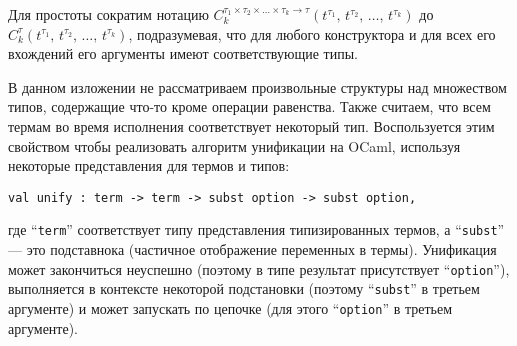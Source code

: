 \noindent Для простоты сократим нотацию  $C_k^{\tau_1\times\tau_2\times\dots\times\tau_k\to\tau}(t^{\tau_1},\,t^{\tau_2},\,\dots,\,t^{\tau_k})$ до
$C_k^\tau(t^{\tau_1},\,t^{\tau_2},\,\dots,\,t^{\tau_k})$, подразумевая, что для любого конструктора и для всех его вхождений его аргументы имеют соответствующие типы.


\begin{comment}
We need also to define the notion of a subterm  $t^\tau[p]$ of a term $t^\tau$ at given position $p$:

$$
\begin{array}{rcl}
 p=\epsilon\mid\{1, 2, 3,\dots\}\bullet p&-&\mbox{the set of positions}\\
 t^\tau[\epsilon]=t^\tau&-&\mbox{base case}\\
 C_k^\tau(t_1^{\tau_1},\,t_2^{\tau_2},\dots,\,t_k^{\tau_k})[i\bullet p]=t_i^{\tau_i}[p], 1\le i \le k&-&\mbox{inductive case}
\end{array}
$$
\end{comment}

В данном изложении   не рассматриваем произвольные структуры над множеством типов, содержащие что-то кроме операции равенства.
Также   считаем, что всем термам во время исполнения соответствует некоторый тип.
Воспользуется этим свойством чтобы реализовать алгоритм унификации на OCaml, используя некоторые представления для термов и типов:

\begin{lstlisting}[mathescape=true]
    val unify : term -> term -> subst option -> subst option,
\end{lstlisting}

\noindent где \enquote{\lstinline=term=} соответствует типу представления типизированных термов, а \enquote{\lstinline=subst=} --- это подставнока (частичное отображение переменных в термы).
Унификация может закончиться неуспешно (поэтому в типе результат присутствует \enquote{\lstinline=option=}),
выполняется в контексте некоторой подстановки (поэтому \enquote{\lstinline=subst=} в третьем аргументе) и может запускать по цепочке (для этого
\enquote{\lstinline=option=} в третьем аргументе).

